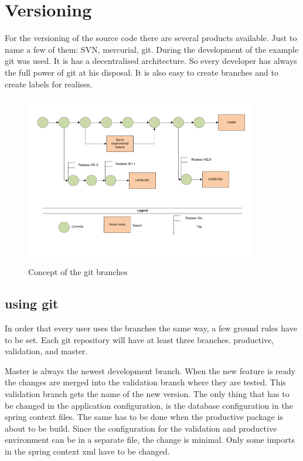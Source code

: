 \documentclass[paper=a4,twoside=false,BCOR=0mm,DIV=calc,fontsize=12pt]{scrartcl}
\begin{document}
\section{Versioning}
For the versioning of the source code there are several products available. Just to name a few of them: SVN, mercurial, git.
During the development of the example git was used. It is has a decentralised architecture. So every developer has always the full power of git at his disposal. It is also easy to create branches and to create labels for realises.

\begin{figure}
    \begin{center}
       \includegraphics[width=0.9\textwidth]{./img/gitversioning.pdf}\\
    \end{center}
  \caption{Concept of the git branches}
  \label{gitbranchconcept}
\end{figure} 

\subsection{using git}
In order that every user uses the branches the same way, a few ground rules have to be set.
Each git repository will have at least three branches. productive, validation, and master.

Master is always the newest development branch. When the new feature is ready the changes are merged into the validation branch where they are tested. This validation branch gets the name of the new version.
The only thing that has to be changed in the application configuration, is the database configuration in the spring context files.
The same has to be done when the productive package is about to be build. Since the configuration for the validation and productive 
environment can be in a separate file, the change is minimal. Only some imports in the spring context xml have to be changed.
\end{document}
